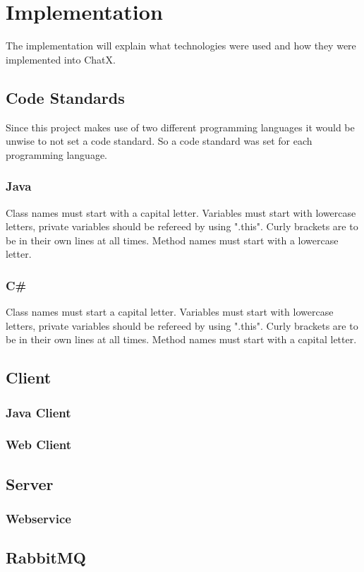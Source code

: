 \chapter{Implementation}

The implementation will explain what technologies were used and how they were implemented into ChatX.

\section{Code Standards}
Since this project makes use of two different programming languages it would be unwise to not set a code standard. So a code standard was set for each programming language.

\subsection{Java}
Class names must start with a capital letter.
Variables must start with lowercase letters, private variables should be refereed by using ".this".
Curly brackets are to be in their own lines at all times.
Method names must start with a lowercase letter.


\subsection{C\#}
Class names must start a capital letter.
Variables must start with lowercase letters, private variables should be refereed by using ".this".
Curly brackets are to be in their own lines at all times.
Method names must start with a capital letter.

\section{Client}

\subsection{Java Client}

\subsection{Web Client}

\section{Server}

\subsection{Webservice}

\section{RabbitMQ}